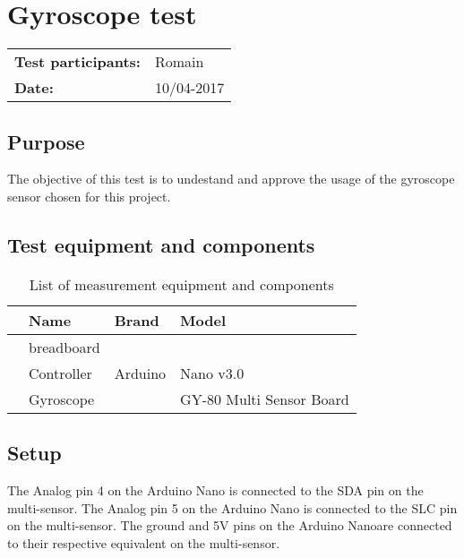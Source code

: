 		\chapter{Gyroscope test}

\begin{table}[!h]
	\begin{tabular}{l l}
		\textbf{Test participants:} & Romain   \\
		\textbf{Date:}  & 10/04-2017
	\end{tabular}
\end{table}

	\section{Purpose}

The objective of this test is to undestand and approve the usage of the gyroscope sensor chosen for this project.

	\section{Test equipment and components}

\begin{table}[htbp]
	\centering
	\caption{List of measurement equipment and components}
	\label{tab_appendix:GyroEquip}
	\begin{tabularx}{\textwidth}{lX}
		& Name & Brand & Model\\ \toprule
		& breadboard &  &  \\
		& Controller & Arduino & Nano v3.0 \\ 
		& Gyroscope & & GY-80 Multi Sensor Board \\
	\end{tabularx}
\end{table}

	\section{Setup}

The Analog pin 4 on the Arduino Nano is connected to the SDA pin on the multi-sensor. The Analog pin 5 on the Arduino Nano is connected to the SLC pin on the multi-sensor. The ground and 5V pins on the Arduino Nanoare connected to their respective equivalent on the multi-sensor.

